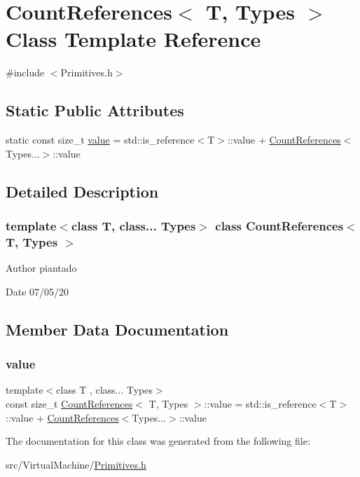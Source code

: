 \hypertarget{struct_count_references}{}\section{Count\+References$<$ T, Types $>$ Class Template Reference}
\label{struct_count_references}


{\ttfamily \#include $<$Primitives.\+h$>$}

\subsection*{Static Public Attributes}
\begin{DoxyCompactItemize}
\item 
static const size\+\_\+t \hyperlink{struct_count_references_abeeaf4de9f66ebc6c15965a5cf92455a}{value} = std\+::is\+\_\+reference$<$T$>$\+::value + \hyperlink{struct_count_references}{Count\+References}$<$Types...$>$\+::value
\end{DoxyCompactItemize}


\subsection{Detailed Description}
\subsubsection*{template$<$class T, class... Types$>$\newline
class Count\+References$<$ T, Types $>$}

\begin{DoxyAuthor}{Author}
piantado 
\end{DoxyAuthor}
\begin{DoxyDate}{Date}
07/05/20 
\end{DoxyDate}


\subsection{Member Data Documentation}
\mbox{\label{struct_count_references_abeeaf4de9f66ebc6c15965a5cf92455a}} 
\subsubsection{\texorpdfstring{value}{value}}
{\footnotesize\ttfamily template$<$class T , class... Types$>$ \\
const size\+\_\+t \hyperlink{struct_count_references}{Count\+References}$<$ T, Types $>$\+::value = std\+::is\+\_\+reference$<$T$>$\+::value + \hyperlink{struct_count_references}{Count\+References}$<$Types...$>$\+::value\hspace{0.3cm}{\ttfamily [static]}}



The documentation for this class was generated from the following file\+:\begin{DoxyCompactItemize}
\item 
src/\+Virtual\+Machine/\hyperlink{_primitives_8h}{Primitives.\+h}\end{DoxyCompactItemize}

